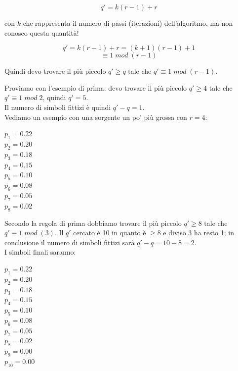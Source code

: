 \begin{equation*}
q' = k(r-1) + r
\end{equation*}

con $k$ che rappresenta il numero di passi (iterazioni) dell'algoritmo, ma non conosco questa quantità!

\newpage

\begin{equation*}
q' = k(r-1) + r = (k+1)(r-1)+1
\end{equation*}
\begin{equation*}
\equiv 1\; mod\;(r-1)
\end{equation*}

Quindi devo trovare il più piccolo $q' \geq q$ tale che $q' \equiv 1 \; mod \;(r-1)$.

Proviamo con l'esempio di prima: devo trovare il più piccolo $q' \geq 4$ tale che $q' \equiv 1 \; mod \; 2$, quindi $q'=5$.\\
Il numero di simboli fittizi è quindi $q'-q=1$.\\

Vediamo un esempio con una sorgente un po' più grossa con $r=4$:

\begin{center}
	$p_1=0.22$\\
	$p_2=0.20$\\
	$p_3=0.18$\\
	$p_4=0.15$\\
	$p_5=0.10$\\
	$p_6=0.08$\\
	$p_7=0.05$\\
	$p_8=0.02$\\
\end{center}

Secondo la regola di prima dobbiamo trovare il più piccolo $q' \geq 8$ tale che $q' \equiv 1 \; mod \; (3)$.
Il $q'$ cercato è 10 in quanto è $\geq8$ e diviso 3 ha resto 1; in conclusione il numero di simboli fittizi sarà $q'-q=10-8=2$.\\
I simboli finali saranno:

\begin{center}
	$p_1=0.22$\\
	$p_2=0.20$\\
	$p_3=0.18$\\
	$p_4=0.15$\\
	$p_5=0.10$\\
	$p_6=0.08$\\
	$p_7=0.05$\\
	$p_8=0.02$\\
	$p_9=0.00$\\
	$p_{10}=0.00$
\end{center}

